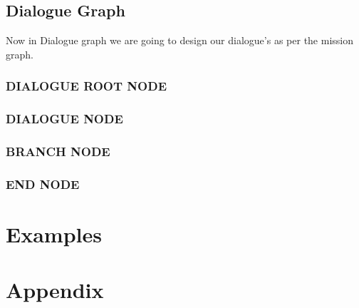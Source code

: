\documentclass[12pt]{article}
\begin{document}
	  \subsection{Dialogue Graph}
	  Now in Dialogue graph we are going to design our dialogue's as per the mission graph.
	  \subsubsection{DIALOGUE ROOT NODE}
	  \subsubsection{DIALOGUE NODE}
	  \subsubsection{BRANCH NODE}
	  \subsubsection{END NODE}
	  \section{Examples}
	  \section{Appendix}
\end{document}
